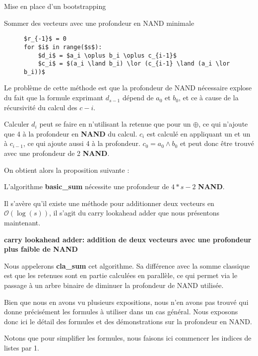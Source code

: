 \begin{section}{Mise en place d'un bootstrapping}
\begin{subsection}{Sommer des vecteurs avec une profondeur en NAND minimale}
\begin{figure}[!h]
\begin{lstlisting}
$r_{-1}$ = 0
for $i$ in range($s$):
	$d_i$ = $a_i \oplus b_i \oplus c_{i-1}$
	$c_i$ = $(a_i \land b_i) \lor (c_{i-1} \land (a_i \lor b_i))$
\end{lstlisting}
\end{figure}

	Le problème de cette méthode est que la profondeur de NAND nécessaire explose du fait que la formule exprimant $d_{s-1}$ dépend de $a_0$ et $b_0$, et ce à cause de la récursivité du calcul des $c-i$.

	Calculer $d_i$ peut se faire en n'utilisant la retenue que pour un $\oplus$, ce qui n'ajoute que 4 à la profondeur en \textbf{NAND} du calcul. $c_i$ est calculé en appliquant un  et un  à $c_{i-1}$, ce qui ajoute aussi 4 à la profondeur. $c_0 = a_0 \land b_0$ et peut donc être trouvé avec une profondeur de 2 \textbf{NAND}.
	
	On obtient alors la proposition suivante :
\begin{prop}
	L'algorithme \textbf{basic\_sum} nécessite une profondeur de $4*s - 2$ \textbf{NAND}.
\end{prop}


	Il s'avère qu'il existe une méthode pour additionner deux vecteurs en $\mathcal{O}(\log(s))$, il s'agit du carry lookahead adder que nous présentons maintenant.

	\textbf{carry lookahead adder: addition de deux vecteurs avec une profondeur plus faible de NAND}

	Nous appelerons \textbf{cla\_sum} cet algorithme. Sa différence avec la somme classique est que les retenues sont en partie calculées en parallèle, ce qui permet via le passage à un arbre binaire de diminuer la profondeur de NAND utilisée.

	Bien que nous en avons vu plusieurs expositions, nous n'en avons pas trouvé qui donne précisément les formules à utiliser dans un cas général. Nous exposons donc ici le détail des formules et des démonstrations sur la profondeur en NAND.

	Notons que pour simplifier les formules, nous faisons ici commencer les indices de listes par 1.


\end{subsection}
\end{section}
